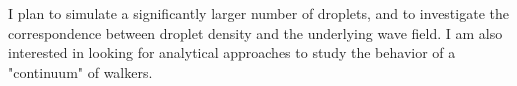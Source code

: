 \documentclass{article}
\begin{document}
I plan to simulate a significantly larger number of droplets, and to investigate the correspondence between droplet density and the underlying wave field. I am also interested in looking for analytical approaches to study the behavior of a "continuum" of walkers.




\end{document}
